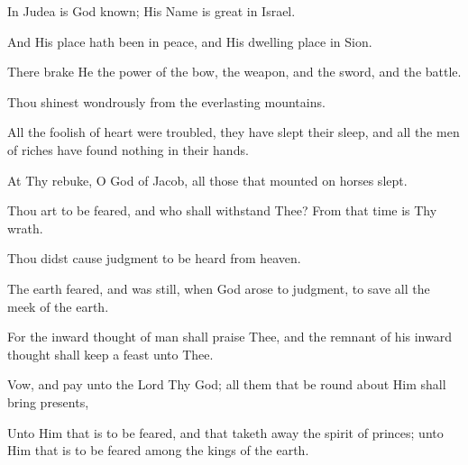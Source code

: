 In Judea is God known; His Name is great in Israel.

And His place hath been in peace, and His dwelling place in Sion.

There brake He the power of the bow, the weapon, and the sword, and the battle.

Thou shinest wondrously from the everlasting mountains.

All the foolish of heart were troubled, they have slept their sleep, and all the men of riches have found nothing in their hands.

At Thy rebuke, O God of Jacob, all those that mounted on horses slept.

Thou art to be feared, and who shall withstand Thee? From that time is Thy wrath.

Thou didst cause judgment to be heard from heaven.

The earth feared, and was still, when God arose to judgment, to save all the meek of the earth.

For the inward thought of man shall praise Thee, and the remnant of his inward thought shall keep a feast unto Thee.

Vow, and pay unto the Lord Thy God; all them that be round about Him shall bring presents,

Unto Him that is to be feared, and that taketh away the spirit of princes; unto Him that is to be feared among the kings of the earth.
